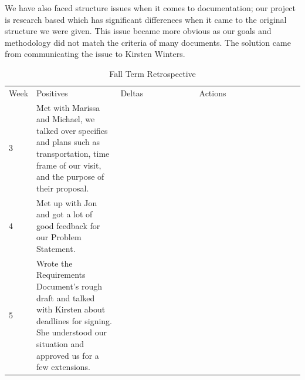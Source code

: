 \documentclass[onecolumn, draftclsnofoot,10pt, compsoc]{IEEEtran}
\begin{document}
We have also faced structure issues when it comes to documentation;  our project is research based which has significant differences when it came to the original structure we were given. This issue became more obvious as our goals and methodology did not match the criteria of many documents. The solution came from communicating the issue to Kirsten Winters. 


\begin{table}[]
\centering
\caption{Fall Term Retrospective}
\label{my-label}
\begin{tabular}{|l|p{0.3\linewidth}|p{0.3\linewidth}|p{0.3\linewidth}|p{0.3\linewidth}}
\cline{1-4}
Week & Positives                                                                                                                                                             & Deltas                                                                                                                            & Actions                                                                                                                                         &  \\ \cline{1-4}
3    & Met with Marissa and Michael, we talked over specifics and plans such as transportation, time frame of our visit, and the purpose of their proposal.                  &                                                                                                                                   &                                                                                                                                                 &  \\ \cline{1-4}
4    & Met up with Jon and got a lot of good feedback for our Problem Statement.                                                                                             &                                                                                                                                   &                                                                                                                                                 &  \\ \cline{1-4}
5    & Wrote the Requirements Document’s rough draft and talked with Kirsten about deadlines for signing. She understood our situation and approved us for a few extensions. &                                                                                                                                   &                                                                                                                                                 &  \\ \cline{1-4}

\end{tabular}
\end{table}
\end{document}
